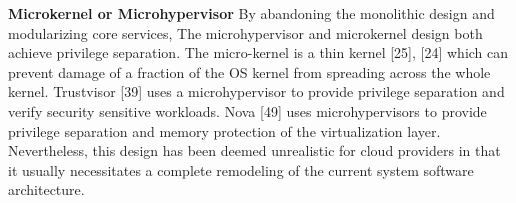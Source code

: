 \documentclass[conference]{IEEEtran}
\begin{document}
\textbf{Microkernel or Microhypervisor}
By abandoning the monolithic design and modularizing core services, The microhypervisor and microkernel design both achieve privilege separation. The micro-kernel is a thin kernel [25], [24]  which can prevent damage of a fraction of the OS kernel from spreading across the whole kernel. Trustvisor [39] uses a microhypervisor to provide privilege separation and verify security sensitive workloads. Nova [49] uses microhypervisors to provide privilege separation and memory protection of the virtualization layer. Nevertheless, this design has been deemed unrealistic for cloud providers in that it usually necessitates a complete remodeling of the current system software architecture. 

\end{document}
